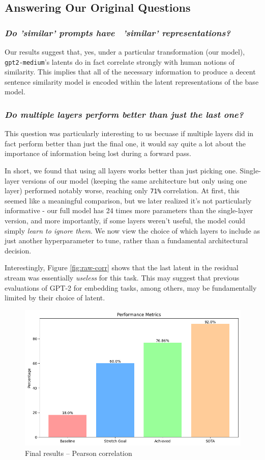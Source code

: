 \documentclass{article}
\begin{document}
\subsection{Answering Our Original Questions} 
\subsubsection{\textit{Do 'similar' prompts have \ 'similar' representations?}}
Our results suggest that, yes, under a particular transformation (our model), \verb|gpt2-medium|'s latents do in fact correlate strongly with human notions of similarity. This implies that all of the necessary information to produce a decent sentence similarity model is encoded within the latent representations of the base model.

\subsubsection{\textit{Do multiple layers perform better than just the last one?}} \label{answering-questions}
This question was particularly interesting to us becuase if multiple layers did in fact perform better than just the final one, it would say quite a lot about the importance of information being lost during a forward pass.

In short, we found that using all layers works better than just picking one. Single-layer versions of our model (keeping the same architecture but only using one layer) performed notably worse, reaching only \verb|71%| correlation. At first, this seemed like a meaningful comparison, but we later realized it's not particularly informative - our full model has 24 times more parameters than the single-layer version, and more importantly, if some layers weren't useful, the model could simply \textit{learn to ignore them}. We now view the choice of which layers to include as just another hyperparameter to tune, rather than a fundamental architectural decision.

Interestingly, Figure \ref{fig:raw-corr} shows that the last latent in the residual stream was essentially \textit{useless} for this task. This may suggest that previous evaluations of GPT-2 for embedding tasks, among others, may be fundamentally limited by their choice of latent.

\begin{figure}
    \centering
    \includegraphics[width=.85\linewidth]{final_results.png}
    \caption{Final results -- Pearson correlation}
    \label{fig:final-reslts}
\end{figure}
\end{document}
